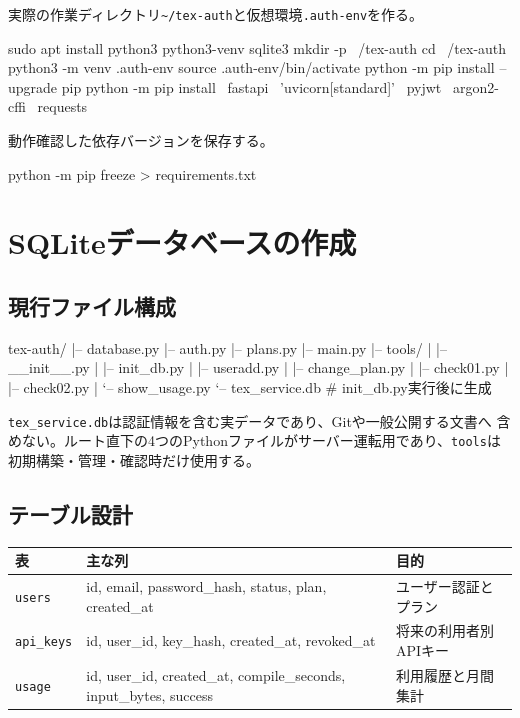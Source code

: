 \documentclass[uplatex,dvipdfmx,a4paper,11pt]{jsarticle}
\begin{document}
実際の作業ディレクトリ\texttt{\~{}/tex-auth}と仮想環境\texttt{.auth-env}を作る。

\begin{command}
sudo apt install python3 python3-venv sqlite3
mkdir -p ~/tex-auth
cd ~/tex-auth
python3 -m venv .auth-env
source .auth-env/bin/activate
python -m pip install --upgrade pip
python -m pip install \
  fastapi \
  'uvicorn[standard]' \
  pyjwt \
  argon2-cffi \
  requests
\end{command}

動作確認した依存バージョンを保存する。

\begin{command}
python -m pip freeze > requirements.txt
\end{command}

\section{SQLiteデータベースの作成}

\subsection{現行ファイル構成}

\begin{command}
tex-auth/
|-- database.py
|-- auth.py
|-- plans.py
|-- main.py
|-- tools/
|   |-- __init__.py
|   |-- init_db.py
|   |-- useradd.py
|   |-- change_plan.py
|   |-- check01.py
|   |-- check02.py
|   `-- show_usage.py
`-- tex_service.db       # init_db.py実行後に生成
\end{command}

\texttt{tex\_service.db}は認証情報を含む実データであり、Gitや一般公開する文書へ
含めない。ルート直下の4つのPythonファイルがサーバー運転用であり、\texttt{tools}は
初期構築・管理・確認時だけ使用する。

\subsection{テーブル設計}

\begin{longtable}{@{}p{27mm}p{53mm}p{70mm}@{}}
\toprule
表 & 主な列 & 目的\\
\midrule
\texttt{users} & id, email, password\_hash, status, plan, created\_at & ユーザー認証とプラン\\
\texttt{api\_keys} & id, user\_id, key\_hash, created\_at, revoked\_at & 将来の利用者別APIキー\\
\texttt{usage} & id, user\_id, created\_at, compile\_seconds, input\_bytes, success & 利用履歴と月間集計\\
\bottomrule
\end{longtable}
\end{document}
